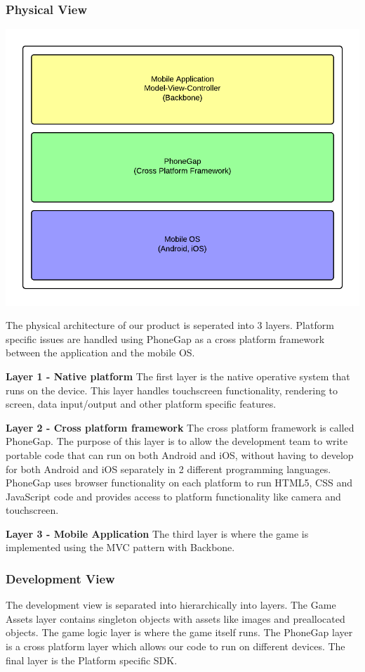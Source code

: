 \subsubsection{Physical View} %
\includegraphics[width=\textwidth]{pictures/physical_view}

The physical architecture of our product is seperated into 3 layers. Platform specific issues are handled using PhoneGap as a cross platform framework between the application and the mobile OS.

{\bf Layer 1 - Native platform}
The first layer is the native operative system that runs on the device. This layer handles touchscreen functionality, rendering to screen, data input/output and other platform specific features.

{\bf Layer 2 - Cross platform framework}
The cross platform framework is called PhoneGap. The purpose of this layer is to allow the development team to write portable code that can run on both Android and iOS, without having to develop for both Android and iOS separately in 2 different programming languages. PhoneGap uses browser functionality on each platform to run HTML5, CSS and JavaScript code and provides access to platform functionality like camera and touchscreen.

{\bf Layer 3 - Mobile Application}
The third layer is where the game is implemented using the MVC pattern with Backbone. 


\subsubsection{Development View} %
The development view is separated into hierarchically into layers. The Game Assets layer contains singleton objects with assets like images and preallocated objects. The game logic layer is where the game itself runs. The PhoneGap layer is a cross platform layer which allows our code to run on different devices. The final layer is the Platform specific SDK.

